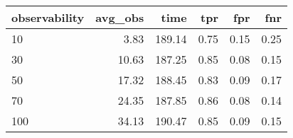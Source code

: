 \begin{tabular}{lrrrrr}
\toprule
observability &  avg\_obs &   time &  tpr &  fpr &  fnr \\
\midrule
           10 &     3.83 & 189.14 & 0.75 & 0.15 & 0.25 \\
           30 &    10.63 & 187.25 & 0.85 & 0.08 & 0.15 \\
           50 &    17.32 & 188.45 & 0.83 & 0.09 & 0.17 \\
           70 &    24.35 & 187.85 & 0.86 & 0.08 & 0.14 \\
          100 &    34.13 & 190.47 & 0.85 & 0.09 & 0.15 \\
\bottomrule
\end{tabular}

